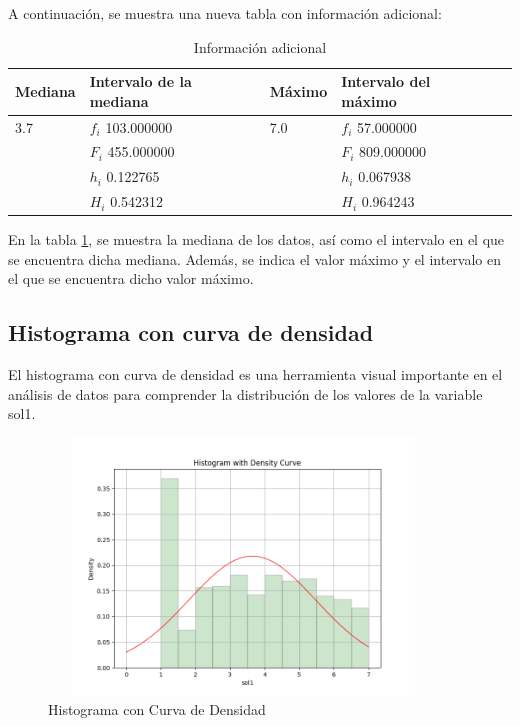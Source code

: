 A continuación, se muestra una nueva tabla con información adicional:

\begin{table}[h]
    \centering
    \caption{Información adicional}
    \begin{tabular}{lllll}
        \hline
        \textbf{Mediana} & \textbf{Intervalo de la mediana} & \textbf{Máximo} & \textbf{Intervalo del máximo} \\
        \hline
        3.7              & $f_i$ 103.000000                 & 7.0             & $f_i$ 57.000000               \\
                         & $F_i$ 455.000000                 &                 & $F_i$ 809.000000              \\
                         & $h_i$ 0.122765                   &                 & $h_i$ 0.067938                \\
                         & $H_i$ 0.542312                   &                 & $H_i$ 0.964243                \\
        \hline
    \end{tabular}%
    \label{tab:informacion_adicional}%
\end{table}%

En la tabla \ref{tab:informacion_adicional}, se muestra la mediana de los datos, así como el intervalo en el que se encuentra dicha mediana. Además, se indica el valor máximo y el intervalo en el que se encuentra dicho valor máximo.

\subsection{Histograma con curva de densidad}

El histograma con curva de densidad es una herramienta visual importante en el análisis de datos para comprender la distribución de los valores de la variable sol1.

\begin{figure}[H]
    \centering
    \includegraphics[width=4.06111in,height=2.68611in]{img/histogramaConCurvaDeDensidad.png}
    \caption{Histograma con Curva de Densidad}
    \label{fig:hist_density}%
\end{figure}%


